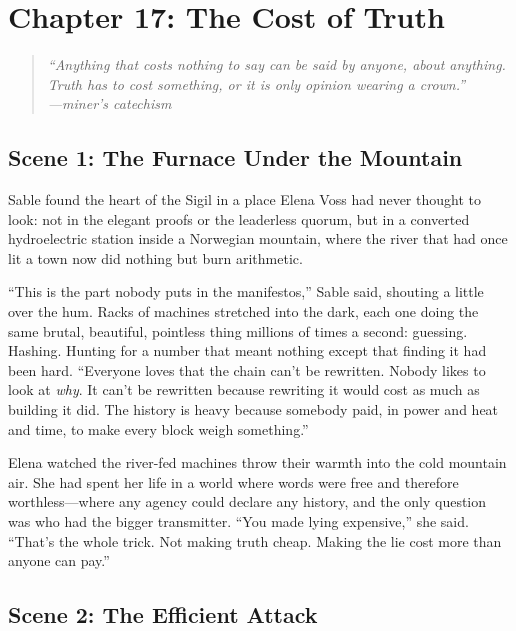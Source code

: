 \hypertarget{chapter-17-the-cost-of-truth}{%
\section{Chapter 17: The Cost of
Truth}\label{chapter-17-the-cost-of-truth}}

\begin{quote}
\itshape ``Anything that costs nothing to say can be said by anyone, about
anything. Truth has to cost something, or it is only opinion wearing a
crown.''\\
\normalfont\hfill---miner's catechism
\end{quote}

\hypertarget{scene-1-the-furnace-under-the-mountain}{%
\subsection{Scene 1: The Furnace Under the
Mountain}\label{scene-1-the-furnace-under-the-mountain}}

Sable found the heart of the Sigil in a place Elena Voss had never thought to
look: not in the elegant proofs or the leaderless quorum, but in a converted
hydroelectric station inside a Norwegian mountain, where the river that had once
lit a town now did nothing but burn arithmetic.

``This is the part nobody puts in the manifestos,'' Sable said, shouting a little
over the hum. Racks of machines stretched into the dark, each one doing the same
brutal, beautiful, pointless thing millions of times a second: guessing. Hashing.
Hunting for a number that meant nothing except that finding it had been hard.
``Everyone loves that the chain can't be rewritten. Nobody likes to look at
\emph{why}. It can't be rewritten because rewriting it would cost as much as
building it did. The history is heavy because somebody paid, in power and heat and
time, to make every block weigh something.''

Elena watched the river-fed machines throw their warmth into the cold mountain
air. She had spent her life in a world where words were free and therefore
worthless---where any agency could declare any history, and the only question was
who had the bigger transmitter. ``You made lying expensive,'' she said. ``That's
the whole trick. Not making truth cheap. Making the lie cost more than anyone can
pay.''

\hypertarget{scene-2-the-efficient-attack}{%
\subsection{Scene 2: The Efficient
Attack}\label{scene-2-the-efficient-attack}}


